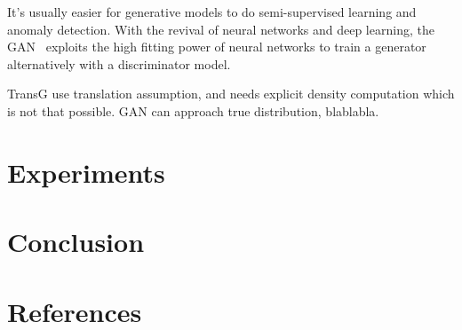 \documentclass[twocolumn,a4paper,10pt,review,3p]{elsarticle}
\begin{document}
It's usually easier for generative models to do semi-supervised learning and anomaly detection. With the revival of neural networks and deep learning, the GAN~\cite{GAN} exploits the high fitting power of neural networks to train a generator alternatively with a discriminator model. 

TransG use translation assumption, and needs explicit density computation which is not that possible.
GAN can approach true distribution, blablabla.


\section{Experiments}


\section{Conclusion}

\section*{References}


\end{document}
